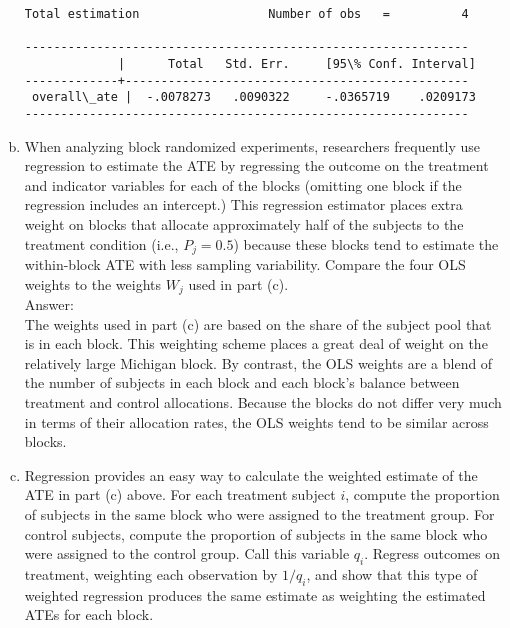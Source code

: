 \documentclass[11pt,notitlepage]{article}\usepackage[]{graphicx}\usepackage[]{color}
\makeatletter
\newenvironment{kframe}{%
 \def\at@end@of@kframe{}%
 \ifinner\ifhmode%
  \def\at@end@of@kframe{\end{minipage}}%
  \begin{minipage}{\columnwidth}%
 \fi\fi%
 \def\FrameCommand##1{\hskip\@totalleftmargin \hskip-\fboxsep
 \colorbox{shadecolor}{##1}\hskip-\fboxsep
     \hskip-\linewidth \hskip-\@totalleftmargin \hskip\columnwidth}%
 \MakeFramed {\advance\hsize-\width
   \@totalleftmargin\z@ \linewidth\hsize
   \@setminipage}}%
 {\par\unskip\endMakeFramed%
 \at@end@of@kframe}
\newenvironment{knitrout}{}{} %
\makeatother
\begin{document}
\begin{enumerate}[a)]
\begin{knitrout}
\begin{kframe}
\begin{Verbatim}[commandchars=\\\{\}]
Total estimation                  Number of obs   =          4

--------------------------------------------------------------
             |      Total   Std. Err.     [95\% Conf. Interval]
-------------+------------------------------------------------
 overall\_ate |  -.0078273   .0090322     -.0365719    .0209173
--------------------------------------------------------------

    \end{Verbatim}
\end{kframe}
\end{knitrout}

\item When analyzing block randomized experiments, researchers frequently use regression to estimate the ATE by regressing the outcome on the treatment and indicator variables for each of the blocks (omitting one block if the regression includes an intercept.)  This regression estimator places extra weight on blocks that allocate approximately half of the subjects to the treatment condition (i.e., $P_j  = 0.5$) because these blocks tend to estimate the within-block ATE with less sampling variability. Compare the four OLS weights to the weights $W_j$ used in part (c).\\
Answer:\\
The weights used in part (c) are based on the share of the subject pool that is in each block.  This weighting scheme places a great deal of weight on the relatively large Michigan block. By contrast, the OLS weights are a blend of the number of subjects in each block and each block's balance between treatment and control allocations. Because the blocks do not differ very much in terms of their allocation rates, the OLS weights tend to be similar across blocks.
\item Regression provides an easy way to calculate the weighted estimate of the ATE in part (c) above. For each treatment subject $i$, compute the proportion of subjects in the same block who were assigned to the treatment group.  For control subjects, compute the proportion of subjects in the same block who were assigned to the control group.  Call this variable $q_i$.  Regress outcomes on treatment, weighting each observation by $1/q_i$, and show that this type of weighted regression produces the same estimate as weighting the estimated ATEs for each block.


\end{enumerate}
\end{document}
